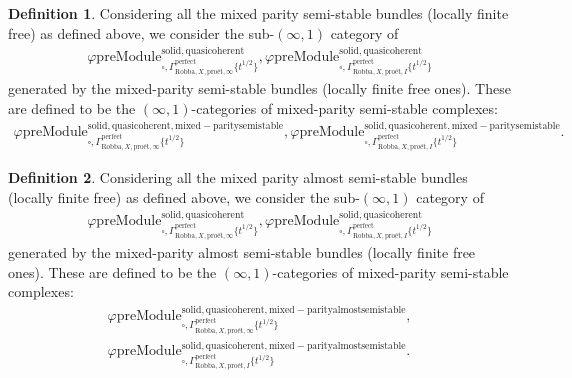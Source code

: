 \documentclass[12pt]{book}
\theoremstyle{definition}
\newtheorem{definition}{Definition}
\begin{document}
\begin{definition}
Considering all the mixed parity semi-stable bundles (locally finite free) as defined above, we consider the sub-$(\infty,1)$ category of 
\begin{align}
\varphi\mathrm{preModule}^\mathrm{solid,quasicoherent}_{\square,\Gamma^\mathrm{perfect}_{\text{Robba},X,\text{pro\'et},\infty}\{t^{1/2}\}},
\varphi\mathrm{preModule}^\mathrm{solid,quasicoherent}_{\square,\Gamma^\mathrm{perfect}_{\text{Robba},X,\text{pro\'et},I}\{t^{1/2}\}} 
\end{align}
generated by the mixed-parity semi-stable bundles (locally finite free ones). These are defined to be the $(\infty,1)$-categories of mixed-parity semi-stable complexes:
\begin{align}
\varphi\mathrm{preModule}^\mathrm{solid,quasicoherent,mixed-paritysemistable}_{\square,\Gamma^\mathrm{perfect}_{\text{Robba},X,\text{pro\'et},\infty}\{t^{1/2}\}},
\varphi\mathrm{preModule}^\mathrm{solid,quasicoherent,mixed-paritysemistable}_{\square,\Gamma^\mathrm{perfect}_{\text{Robba},X,\text{pro\'et},I}\{t^{1/2}\}}. 
\end{align}
\end{definition}


\begin{definition}
Considering all the mixed parity almost semi-stable bundles (locally finite free) as defined above, we consider the sub-$(\infty,1)$ category of 
\begin{align}
\varphi\mathrm{preModule}^\mathrm{solid,quasicoherent}_{\square,\Gamma^\mathrm{perfect}_{\text{Robba},X,\text{pro\'et},\infty}\{t^{1/2}\}},
\varphi\mathrm{preModule}^\mathrm{solid,quasicoherent}_{\square,\Gamma^\mathrm{perfect}_{\text{Robba},X,\text{pro\'et},I}\{t^{1/2}\}} 
\end{align}
generated by the mixed-parity almost semi-stable bundles (locally finite free ones). These are defined to be the $(\infty,1)$-categories of mixed-parity semi-stable complexes:
\begin{align}
\varphi\mathrm{preModule}^\mathrm{solid,quasicoherent,mixed-parityalmostsemistable}_{\square,\Gamma^\mathrm{perfect}_{\text{Robba},X,\text{pro\'et},\infty}\{t^{1/2}\}},\\
\varphi\mathrm{preModule}^\mathrm{solid,quasicoherent,mixed-parityalmostsemistable}_{\square,\Gamma^\mathrm{perfect}_{\text{Robba},X,\text{pro\'et},I}\{t^{1/2}\}}. 
\end{align}
\end{definition}
\end{document}
